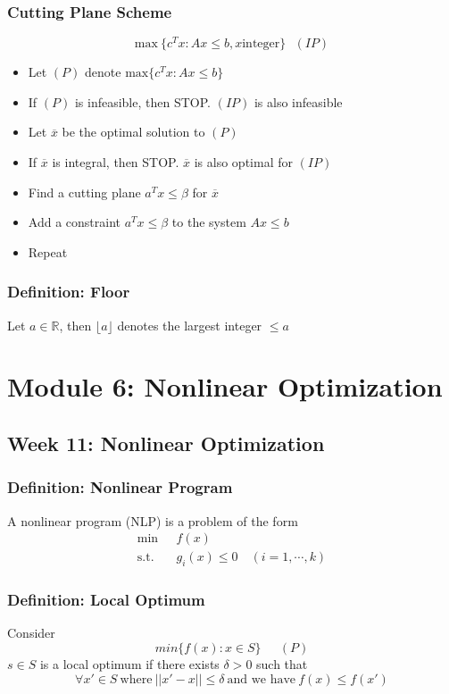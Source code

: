 \documentclass[11pt]{article}
\newcommand{\R}{{\mathbb{R}}}
\begin{document}
\subsubsection{Cutting Plane Scheme}
\[\text{max}\ \{c^Tx:Ax\leq b, x\text{integer}\} \ \ \ (IP)\]
\begin{itemize}
  \item Let $(P)$ denote $\text{max}\{c^Tx: Ax\leq b\}$
  \item If $(P)$ is infeasible, then STOP. $(IP)$ is also infeasible 
  \item Let $\overline{x}$ be the optimal solution to $(P)$ 
  \item If $\overline{x}$ is integral, then STOP. $\overline{x}$ is also optimal for $(IP)$
  \item Find a cutting plane $a^Tx\leq\beta$ for $\overline{x}$
  \item Add a constraint $a^Tx\leq\beta$ to the system $Ax\leq b$
  \item Repeat 
\end{itemize}
\subsubsection{Definition: Floor}
Let $a\in\R$, then $\lfloor a\rfloor$ denotes the largest integer $\leq a$

\section{Module 6: Nonlinear Optimization}
\subsection{Week 11: Nonlinear Optimization}
\subsubsection{Definition: Nonlinear Program}
A nonlinear program (NLP) is a problem of the form 
\begin{align*}
  \text{min}\ \ \ &f(x) \\
  \text{s.t.}\ \ \ &g_i(x)\leq 0\quad (i=1,\cdots,k)
\end{align*}
\subsubsection{Definition: Local Optimum}
Consider \[min\{f(x):x\in S\} \ \ \quad (P)\]
$s\in S$ is a local optimum if there exists $\delta>0$ such that 
\[\forall x'\in S\ \text{where}\ ||x'-x||\leq \delta\ \text{and we have}\ f(x)\leq f(x')\]
\end{document}
